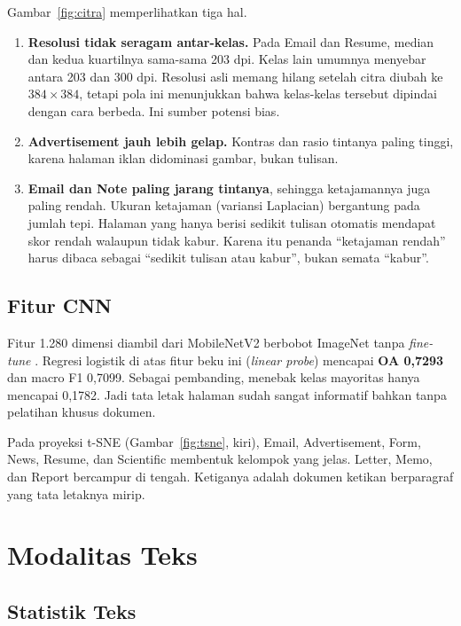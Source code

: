 Gambar~\ref{fig:citra} memperlihatkan tiga hal.
\begin{enumerate}
  \item \textbf{Resolusi tidak seragam antar-kelas.} Pada Email dan Resume, median dan
  kedua kuartilnya sama-sama 203 dpi. Kelas lain umumnya menyebar antara 203 dan 300 dpi.
  Resolusi asli memang hilang setelah citra diubah ke $384\times384$, tetapi pola ini
  menunjukkan bahwa kelas-kelas tersebut dipindai dengan cara berbeda. Ini sumber potensi
  bias.
  \item \textbf{Advertisement jauh lebih gelap.} Kontras dan rasio tintanya paling
  tinggi, karena halaman iklan didominasi gambar, bukan tulisan.
  \item \textbf{Email dan Note paling jarang tintanya}, sehingga ketajamannya juga paling
  rendah. Ukuran ketajaman (variansi Laplacian) bergantung pada jumlah tepi. Halaman yang
  hanya berisi sedikit tulisan otomatis mendapat skor rendah walaupun tidak kabur.
  Karena itu penanda \enquote{ketajaman rendah} harus dibaca sebagai \enquote{sedikit
  tulisan atau kabur}, bukan semata \enquote{kabur}.
\end{enumerate}

\subsection{Fitur CNN}

Fitur 1.280 dimensi diambil dari MobileNetV2 berbobot ImageNet tanpa
\textit{fine-tune} \parencite{sandler2018}. Regresi logistik di atas fitur beku ini
(\textit{linear probe}) mencapai \textbf{OA 0,7293} dan macro F1 0,7099. Sebagai
pembanding, menebak kelas mayoritas hanya mencapai 0,1782. Jadi tata letak halaman sudah
sangat informatif bahkan tanpa pelatihan khusus dokumen.

Pada proyeksi t-SNE (Gambar~\ref{fig:tsne}, kiri), Email, Advertisement, Form, News,
Resume, dan Scientific membentuk kelompok yang jelas. Letter, Memo, dan Report bercampur
di tengah. Ketiganya adalah dokumen ketikan berparagraf yang tata letaknya mirip.

\section{Modalitas Teks}\label{sec:teks}

\subsection{Statistik Teks}

